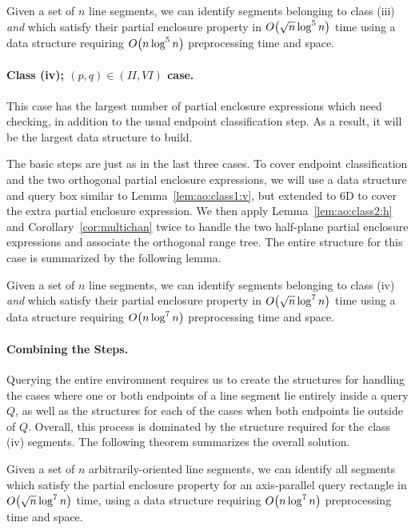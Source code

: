 \begin{lemma}
\label{lem:ao:class3:c}
Given a set of $n$ line segments, we can identify segments belonging to class (iii) \emph{and} which satisfy their partial enclosure property in $O\!\left(\sqrt{n}\log^5{n}\right)$ time using a data structure requiring $O\!\left(n\log^5{n}\right)$ preprocessing time and space.
\end{lemma}


\paragraph{Class (iv); $(p, q) \in (II, VI)$ case.} 
This case has the largest number of partial enclosure expressions which need checking, in addition to the usual endpoint classification step. 
As a result, it will be the largest data structure to build.

The basic steps are just as in the last three cases. 
To cover endpoint classification and the two orthogonal partial enclosure expressions, we will use a data structure and query box similar to Lemma~\ref{lem:ao:class1:v}, but extended to 6D to cover the extra partial enclosure expression.
We then apply Lemma~\ref{lem:ao:class2:h} and Corollary~\ref{cor:multichan} twice to handle the two half-plane partial enclosure expressions and associate the orthogonal range tree. 
The entire structure for this case is summarized by the following lemma.

\begin{lemma}
\label{lem:ao:class4:c}
Given a set of $n$ line segments, we can identify segments belonging to class (iv) \emph{and} which satisfy their partial enclosure property in $O\!\left(\sqrt{n}\log^7{n}\right)$ time using a data structure requiring $O\!\left(n\log^7{n}\right)$ preprocessing time and space.
\end{lemma}


\paragraph{Combining the Steps.} 

Querying the entire environment requires us to create the structures for handling the cases where one or both endpoints of a line segment lie entirely inside a query $Q$, as well as the structures for each of the cases when both endpoints lie outside of $Q$. 
Overall, this process is dominated by the structure required for the class (iv) segments. 
The following theorem summarizes the overall solution.

\begin{theorem}
\label{th:ao}
Given a set of $n$ arbitrarily-oriented line segments, we can identify all segments which satisfy the partial enclosure property for an axis-parallel query rectangle in $O\!\left(\sqrt{n}\log^7{n}\right)$ time, using a data structure requiring $O\!\left(n\log^7{n}\right)$ preprocessing time and space.
\end{theorem}


